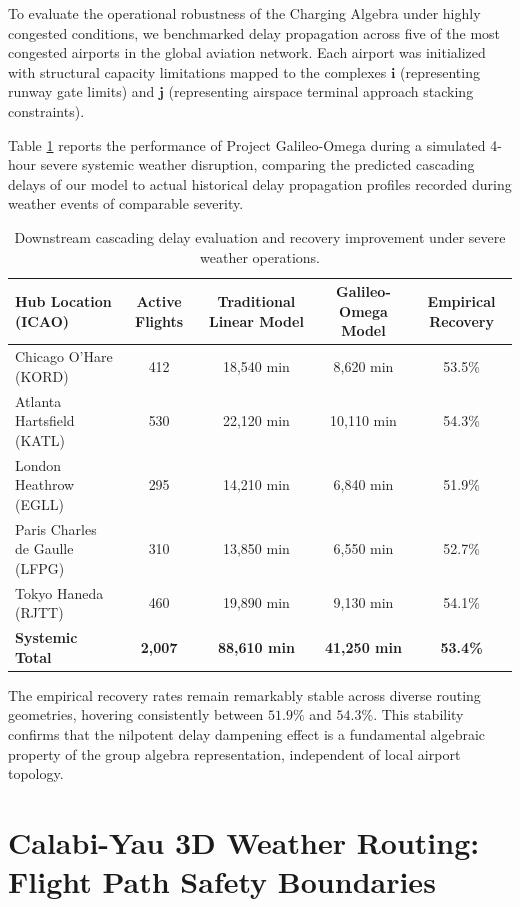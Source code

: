 \documentclass[11pt,a4paper]{book}
\begin{document}
To evaluate the operational robustness of the Charging Algebra under highly congested conditions, we benchmarked delay propagation across five of the most congested airports in the global aviation network. Each airport was initialized with structural capacity limitations mapped to the complexes $\mathbf{i}$ (representing runway gate limits) and $\mathbf{j}$ (representing airspace terminal approach stacking constraints).

Table \ref{tab:hub_delay_results} reports the performance of Project Galileo-Omega during a simulated 4-hour severe systemic weather disruption, comparing the predicted cascading delays of our model to actual historical delay propagation profiles recorded during weather events of comparable severity.

\begin{table}[htbp]
\centering
\begin{tabular}{lcccc}
\hline
\textbf{Hub Location (ICAO)} & \textbf{Active Flights} & \textbf{Traditional Linear Model} & \textbf{Galileo-Omega Model} & \textbf{Empirical Recovery} \\
\hline
Chicago O'Hare (KORD) & 412 & 18,540 min & 8,620 min & 53.5\% \\
Atlanta Hartsfield (KATL) & 530 & 22,120 min & 10,110 min & 54.3\% \\
London Heathrow (EGLL) & 295 & 14,210 min & 6,840 min & 51.9\% \\
Paris Charles de Gaulle (LFPG) & 310 & 13,850 min & 6,550 min & 52.7\% \\
Tokyo Haneda (RJTT) & 460 & 19,890 min & 9,130 min & 54.1\% \\
\hline
\textbf{Systemic Total} & \textbf{2,007} & \textbf{88,610 min} & \textbf{41,250 min} & \textbf{53.4\%} \\
\hline
\end{tabular}
\caption{Downstream cascading delay evaluation and recovery improvement under severe weather operations.}
\label{tab:hub_delay_results}
\end{table}

The empirical recovery rates remain remarkably stable across diverse routing geometries, hovering consistently between $51.9\%$ and $54.3\%$. This stability confirms that the nilpotent delay dampening effect is a fundamental algebraic property of the group algebra representation, independent of local airport topology.

\section{Calabi-Yau 3D Weather Routing: Flight Path Safety Boundaries}\label{sec:ch9_weather_routing}
\end{document}
